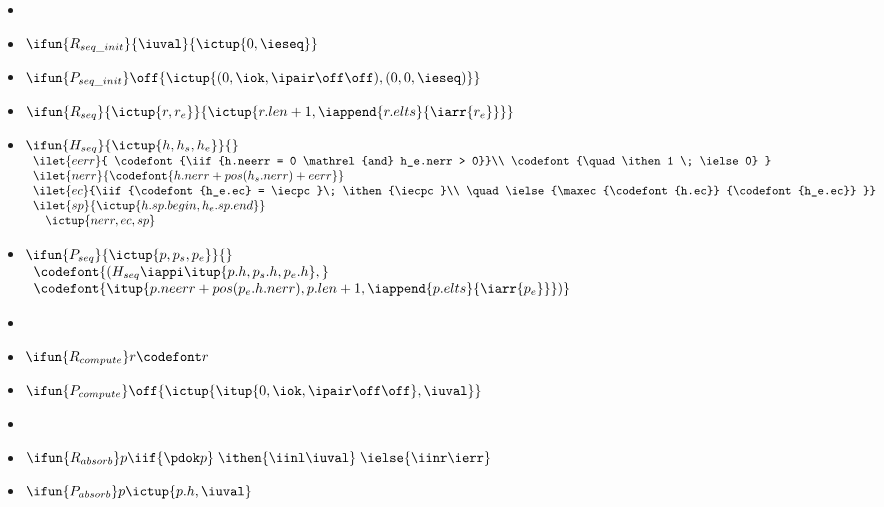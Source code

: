  \begin{itemize}
 \renewcommand{\labelitemi}{}

\item %
\item $\ifun {R_{seq\_init}} {\iuval} {\ictup{0,\ieseq}}$   
\item $\ifun {P_{seq\_init}} \off {\ictup{(0,\iok,\ipair \off
      \off),(0,0,\ieseq)}}$

\item $\ifun {R_{seq}} {\ictup{r, r_e}} 
  {\ictup{r.len+1,\iappend{r.elts} {\iarr{r_e}}}}$
\item $\ifun {H_{seq}} {\ictup{h, h_s, h_e}} {}$ \\
  $\begin{array}{l}
      \ilet {eerr} {
        \codefont{\iif {h.neerr = 0 \mathrel{and} h_e.nerr > 0}}\\
        \codefont{\quad \ithen 1 \;  \ielse 0}
      }\\
      \ilet {nerr} {\codefont{h.nerr + pos(h_s.nerr) + eerr}}\\
      \ilet {ec} {\iif{\codefont{h_e.ec} = \iecpc}\; \ithen {\iecpc}\\
      \quad \ielse{\maxec {\codefont{h.ec}} {\codefont{h_e.ec}}
          }} \\
      \ilet {sp} {\ictup{h.sp.begin,h_e.sp.end}} \\
      \quad \ictup {nerr,ec,sp}
    \end{array}$

\item $\ifun{P_{seq}} {\ictup{p, p_s, p_e}}{}$ \\ 
  $\begin{array}{l}
    \codefont{(H_{seq} \iappi \itup{p.h,p_s.h,p_e.h},}\\ 
    \codefont{\itup{p.neerr + pos(p_e.h.nerr), p.len + 1,\iappend {p.elts}
        {\iarr{p_e}}})}
  \end{array}$

\item %
\item $\ifun{R_{compute}} r {\codefont r}$
\item $\ifun{P_{compute}} \off {\ictup{\itup{0,\iok,\ipair \off \off},\iuval}}$

\item %
\item $\ifun {R_{absorb}} p {\iif {\pdok p}\; 
    \ithen {\iinl \iuval}\; \ielse {\iinr \ierr}}$
\item $\ifun {P_{absorb}} p {\ictup{p.h,\iuval}}$


\end{itemize}
